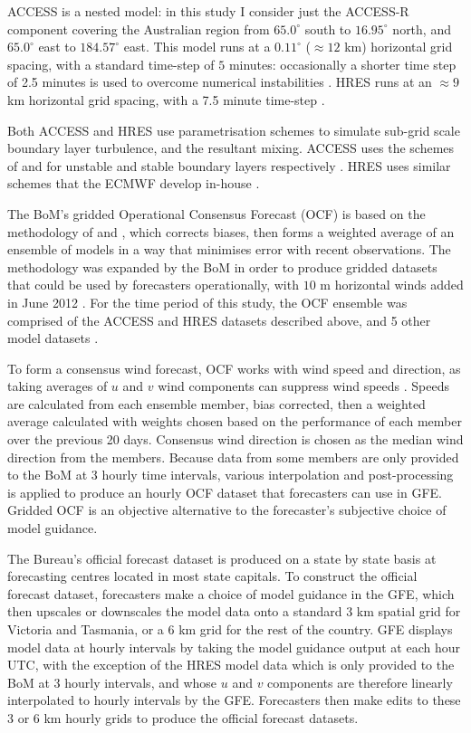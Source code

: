 \documentclass[twocol]{ametsoc}
\begin{document}
ACCESS is a nested model: in this study I consider just the ACCESS-R component covering the Australian region from $65.0^\circ$ south to $16.95^\circ$ north, and $65.0^\circ$ east to $184.57^\circ$ east. This model runs at a $0.11^\circ$ ($\approx 12$ km) horizontal grid spacing, with a standard time-step of $5$ minutes: occasionally a shorter time step of 2.5 minutes is used to overcome numerical instabilities \citep{bom16}. HRES runs at an $\approx 9$ km horizontal grid spacing, with a 7.5 minute time-step \citep{ecmwf19c}. 

Both ACCESS and HRES use parametrisation schemes to simulate sub-grid scale boundary layer turbulence, and the resultant mixing. ACCESS uses the schemes of \citet{lock00} and \citet{louis79} for unstable and stable boundary layers respectively \citep{bom10}. HRES uses similar schemes that the ECMWF develop in-house \citep{ecmwf19a}.

The BoM's gridded Operational Consensus Forecast (OCF) is based on the methodology of \citet{woodcock05} and \citet{engel07}, which corrects biases, then forms a weighted average of an ensemble of models in a way that minimises error with recent observations. The methodology was expanded by the BoM in order to produce gridded datasets that could be used by forecasters operationally, with $10$ m horizontal winds added in June 2012 \citep{bom05, bom08, bom12}. For the time period of this study, the OCF ensemble was comprised of the ACCESS and HRES datasets described above, and 5 other model datasets  \citep{bom18}.

To form a consensus wind forecast, OCF works with wind speed and direction, as taking averages of $u$ and $v$ wind components can suppress wind speeds \citep{glahn72}. Speeds are calculated from each ensemble member, bias corrected, then a weighted average calculated with weights chosen based on the performance of each member over the previous 20 days. Consensus wind direction is chosen as the median wind direction from the members. Because data from some members are only provided to the BoM at 3 hourly time intervals, various interpolation and post-processing  is applied to produce an hourly OCF dataset that forecasters can use in GFE. Gridded OCF is an objective alternative to the forecaster's subjective choice of model guidance.  

The Bureau's official forecast dataset is produced on a state by state basis at forecasting centres located in most state capitals. To construct the official forecast dataset, forecasters make a choice of model guidance in the GFE, which then upscales or downscales the model data onto a standard 3 km spatial grid for Victoria and Tasmania, or a 6 km grid for the rest of the country. GFE displays model data at hourly intervals by taking the model guidance output at each hour UTC, with the exception of the HRES model data which is only provided to the BoM at 3 hourly intervals, and whose $u$ and $v$ components are therefore linearly interpolated to hourly intervals by the GFE. Forecasters then make edits to these 3 or 6 km hourly grids to produce the official forecast datasets.
\end{document}
